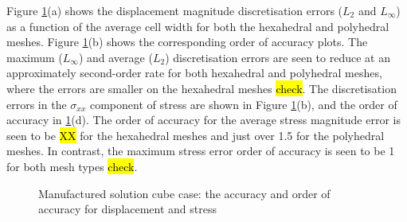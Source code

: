 \documentclass[sn-mathphys,Numbered]{sn-jnl}%
\begin{document}
Figure \ref{fig:mms_accuracy}(a) shows the displacement magnitude discretisation errors ($L_2$ and $L_\infty$) as a function of the average cell width for both the hexahedral and polyhedral meshes.
Figure \ref{fig:mms_accuracy}(b) shows the corresponding order of accuracy plots.
The maximum ($L_\infty$) and average ($L_2$) discretisation errors are seen to reduce at an approximately second-order rate for both hexahedral and polyhedral meshes, where the errors are smaller on the hexahedral meshes \hl{check}.
The discretisation errors in the $\sigma_{xx}$ component of stress are shown in Figure \ref{fig:mms_accuracy}(b), and the order of accuracy in \ref{fig:mms_accuracy}(d).
The order of accuracy for the average stress magnitude error is seen to be \hl{XX} for the hexahedral meshes and just over 1.5 for the polyhedral meshes.
In contrast, the maximum stress error order of accuracy is seen to be 1 for both mesh types \hl{check}.
\begin{figure}[htbp]
	\centering
	\caption{Manufactured solution cube case: the accuracy and order of accuracy for displacement and stress}
	\label{fig:mms_accuracy}
\end{figure}
\end{document}
